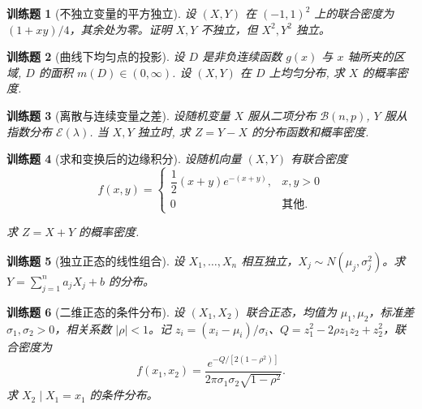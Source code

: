 \documentclass[UTF8,12pt,a4paper,fontset=fandol]{ctexbook}
\newtheorem{exercise}{训练题}[section]
\begin{document}
\begin{exercise}[不独立变量的平方独立]\label{q:A4.17}
设 $(X,Y)$ 在 $(-1,1)^2$ 上的联合密度为 $(1+xy)/4$，其余处为零。证明 $X,Y$ 不独立，但 $X^2,Y^2$ 独立。\par{}\end{exercise}

\begin{exercise}[曲线下均匀点的投影]\label{q:A4.18}
设 $D$ 是非负连续函数 $g(x)$ 与 $x$ 轴所夹的区域, $D$ 的面积 $m(D)\in(0,\infty)$. 设 $(X,Y)$ 在 $D$ 上均匀分布, 求 $X$ 的概率密度.\par{}\end{exercise}

\begin{exercise}[离散与连续变量之差]\label{q:A4.19}
设随机变量 $X$ 服从二项分布 $\mathcal{B}(n,p)$, $Y$ 服从指数分布 $\mathcal{E}(\lambda)$. 当 $X,Y$ 独立时, 求 $Z=Y-X$ 的分布函数和概率密度.\par{}\end{exercise}

\begin{exercise}[求和变换后的边缘积分]\label{q:A4.23}
设随机向量 $(X,Y)$ 有联合密度
    \[f(x,y)=\begin{cases}
        \dfrac{1}{2}(x+y)e^{-(x+y)}, & x,y>0 \\
        0 & \text{其他}.
    \end{cases}\]

    求 $Z=X+Y$ 的概率密度.\par{}\end{exercise}

\begin{exercise}[独立正态的线性组合]\label{q:A4.27}
设 $X_1,\ldots,X_n$ 相互独立，$X_j\sim N(\mu_j,\sigma_j^2)$。求 $Y=\sum_{j=1}^n a_jX_j+b$ 的分布。\par{}\end{exercise}

\begin{exercise}[二维正态的条件分布]\label{q:A4.28}
设 $(X_1,X_2)$ 联合正态，均值为 $\mu_1,\mu_2$，标准差 $\sigma_1,\sigma_2>0$，相关系数 $|\rho|<1$。记 $z_i=(x_i-\mu_i)/\sigma_i$、$Q=z_1^2-2\rho z_1z_2+z_2^2$，联合密度为\[f(x_1,x_2)=\frac{e^{-Q/[2(1-\rho^2)]}}{2\pi\sigma_1\sigma_2\sqrt{1-\rho^2}}.\]求 $X_2\mid X_1=x_1$ 的条件分布。\par{}\end{exercise}
\end{document}
